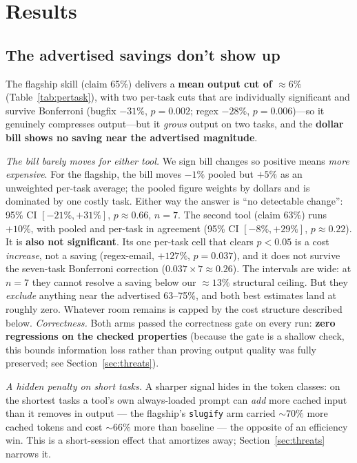 \section{Results}
\label{sec:results}
\subsection{The advertised savings don't show up}
The flagship skill (claim 65\%)
delivers a \textbf{mean output cut of ${\approx}6\%$} (Table~\ref{tab:pertask}), with two per-task cuts that are individually
significant and survive Bonferroni (bugfix $-31\%$, $p{=}0.002$; regex $-28\%$, $p{=}0.006$)---so it
genuinely compresses output---but it \emph{grows} output on two tasks, and the \textbf{dollar bill shows no saving near the
advertised magnitude}.

\emph{The bill barely moves for either tool.} We sign bill changes so positive means \emph{more expensive}. For
the flagship, the bill moves $-1\%$ pooled but $+5\%$ as an unweighted per-task average; the pooled
figure weights by dollars and is dominated by one costly task. Either way the answer is ``no
detectable change'': 95\% CI $[-21\%,+31\%]$, $p{\approx}0.66$, $n{=}7$. The second tool (claim 63\%) runs $+10\%$, with pooled and
per-task in agreement (95\% CI $[-8\%,+29\%]$, $p{\approx}0.22$). It is \textbf{also not significant}.
Its one per-task cell that clears $p<0.05$ is a cost \emph{increase}, not a saving (regex-email,
$+127\%$, $p{=}0.037$), and it does not survive the seven-task Bonferroni correction
($0.037\times7{\approx}0.26$). The intervals are wide: at $n{=}7$ they cannot resolve a saving below our
${\approx}13\%$ structural ceiling. But they \emph{exclude} anything near the advertised 63--75\%, and
both best estimates land at roughly zero. Whatever room remains is capped by the cost structure
described below.
\emph{Correctness.} Both arms passed the correctness gate on every run: \textbf{zero regressions on the checked properties}
(because the gate is a shallow check, this bounds information loss rather than proving output quality was fully
preserved; see Section~\ref{sec:threats}).

\emph{A hidden penalty on short tasks.} A sharper signal hides in the token classes: on the shortest
tasks a tool's own always-loaded prompt can \emph{add} more cached input than it removes in output ---
the flagship's \texttt{slugify} arm carried ${\sim}70\%$ more cached tokens and cost ${\sim}66\%$ more
than baseline --- the opposite of an efficiency win. This is a short-session effect that amortizes
away; Section~\ref{sec:threats} narrows it.


